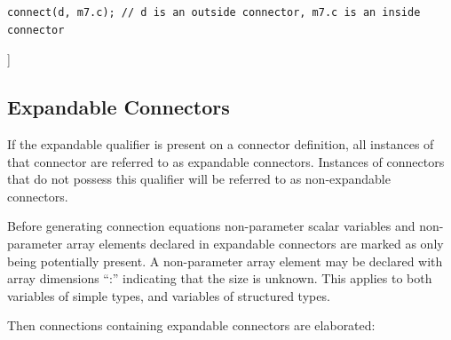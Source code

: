 \documentclass[10pt,a4paper]{report}
\def\doublelabel#1{\label{#1}\hypertarget{#1}{}}
\begin{document}
\begin{lstlisting}[language=modelica]
  connect(d, m7.c); // d is an outside connector, m7.c is an inside connector
\end{lstlisting}
{]}

\subsection{Expandable Connectors}\doublelabel{expandable-connectors}

If the expandable qualifier is present on a connector definition, all
instances of that connector are referred to as expandable connectors.
Instances of connectors that do not possess this qualifier will be
referred to as non-expandable connectors.

Before generating connection equations non-parameter scalar variables
and non-parameter array elements declared in expandable connectors are
marked as only being potentially present. A non-parameter array element
may be declared with array dimensions ``:'' indicating that the size is
unknown. This applies to both variables of simple types, and variables
of structured types.

Then connections containing expandable connectors are elaborated:
\end{document}
